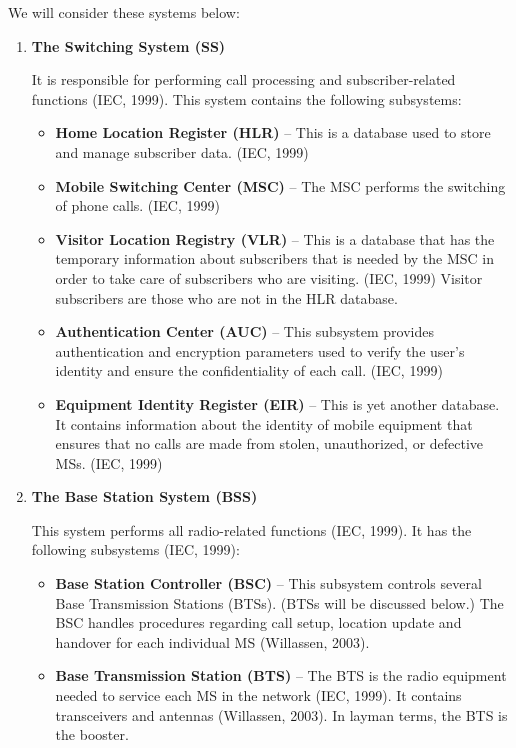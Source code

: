 \documentclass[12pt,svgnames,smaller]{article} %
\begin{document}
	We will consider these systems below:
		
	\begin{enumerate}
		
		\item \textbf{ The Switching System (SS)}
		
		It is responsible for performing call processing and subscriber-related functions (IEC, 1999). This system contains the following subsystems:
		
		\begin{itemize}
			\item \textbf{Home Location Register (HLR)} – This is a database used to store and manage subscriber data. (IEC, 1999)
			\item \textbf{Mobile Switching Center (MSC)} – The MSC performs the switching of phone calls. (IEC, 1999)
			\item \textbf{Visitor Location Registry (VLR)} – This is a database that has the temporary information about subscribers that is needed by the MSC in order to take care of subscribers who are visiting. (IEC, 1999) Visitor subscribers are those who are not in the HLR database. 
			\item \textbf{Authentication Center (AUC)} – This subsystem provides authentication and encryption parameters used to verify the user’s identity and ensure the confidentiality of each call. (IEC, 1999)
			\item \textbf{Equipment Identity Register (EIR)} – This is yet another database. It contains information about the identity of mobile equipment that ensures that no calls are made from stolen, unauthorized, or defective MSs. (IEC, 1999)
		\end{itemize}
		
		
		\item \textbf{ The Base Station System (BSS)}
		
		This system performs all radio-related functions (IEC, 1999).  It has the following subsystems (IEC, 1999):

		\begin{itemize}
			\item \textbf{Base Station Controller (BSC)} – This subsystem controls several Base Transmission Stations (BTSs). (BTSs will be discussed below.) The BSC handles procedures regarding call setup, location update and handover for each individual MS (Willassen, 2003).
			\item \textbf{Base Transmission Station (BTS)} – The BTS is the radio equipment needed to service each MS in the network (IEC, 1999). It contains transceivers and antennas (Willassen, 2003). In layman terms, the BTS is the booster. 
		\end{itemize}
		

\end{enumerate}
\end{document}
